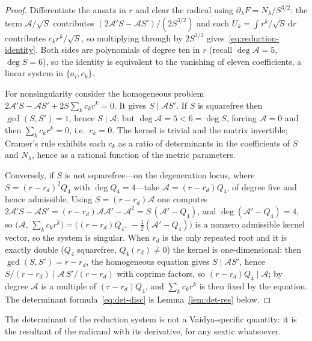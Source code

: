 \documentclass[12pt]{iopart}
\newcommand{\dd}{\mathrm{d}}
\theoremstyle{plain}
\theoremstyle{definition}
\theoremstyle{plain}
\theoremstyle{remark}
\begin{document}
\begin{proof}
Differentiate the ansatz in $r$ and clear the radical using
$\partial_\lambda F=N_\lambda/S^{3/2}$: the term $\mathcal{A}/\sqrt S$ contributes
$(2\mathcal{A}'S-\mathcal{A}S')/(2S^{3/2})$ and each $U_k=\int r^k/\sqrt S\,\dd r$
contributes $c_k r^k/\sqrt S$, so multiplying through by $2S^{3/2}$
gives~\eqref{eq:reduction-identity}. Both sides are polynomials of degree ten in $r$
(recall $\deg\mathcal{A}=5$, $\deg S=6$), so the identity is equivalent to the vanishing
of eleven coefficients, a linear system in $\{a_i,c_k\}$.

For nonsingularity consider the homogeneous problem
$2\mathcal{A}'S-\mathcal{A}S'+2S\sum_k c_kr^k=0$. It gives $S\mid \mathcal{A}S'$. If $S$
is squarefree then $\gcd(S,S')=1$, hence $S\mid\mathcal{A}$; but
$\deg\mathcal{A}=5<6=\deg S$, forcing $\mathcal{A}=0$ and then $\sum_kc_kr^k=0$, i.e.\
$c_k=0$. The kernel is trivial and the matrix invertible; Cramer's rule exhibits each
$c_k$ as a ratio of determinants in the coefficients of $S$ and $N_\lambda$, hence as a
rational function of the metric parameters.

Conversely, if $S$ is not squarefree---on the degeneration locus, where
$S=(r-r_d)^2Q_4$ with $\deg Q_4=4$---take $\mathcal{A}=(r-r_d)Q_4$, of degree five and
hence admissible. Using $S=(r-r_d)\mathcal{A}$ one computes
$2\mathcal{A}'S-\mathcal{A}S'=(r-r_d)\mathcal{A}\mathcal{A}'-\mathcal{A}^2
=S\,(\mathcal{A}'-Q_4)$, and $\deg(\mathcal{A}'-Q_4)=4$, so
$\big(\mathcal{A},\,\sum_kc_kr^k\big)=\big((r-r_d)Q_4,\,-\tfrac12(\mathcal{A}'-Q_4)\big)$
is a nonzero admissible kernel vector, so the system is singular. When $r_d$ is the only
repeated root and it is exactly double ($Q_4$ squarefree, $Q_4(r_d)\neq0$) the kernel is
one-dimensional: then $\gcd(S,S')=r-r_d$, the homogeneous equation gives
$S\mid\mathcal{A}S'$, hence $S/(r-r_d)\mid\mathcal{A}\,S'/(r-r_d)$ with coprime factors,
so $(r-r_d)Q_4\mid\mathcal{A}$; by degree $\mathcal{A}$ is a multiple of $(r-r_d)Q_4$, and
$\sum_kc_kr^k$ is then fixed by the equation. The determinant formula~\eqref{eq:det-disc} is Lemma~\ref{lem:det-res} below.
\end{proof}

The determinant of the reduction system is not a Vaidya-specific quantity: it is the
resultant of the radicand with its derivative, for any sextic whatsoever.
\end{document}
